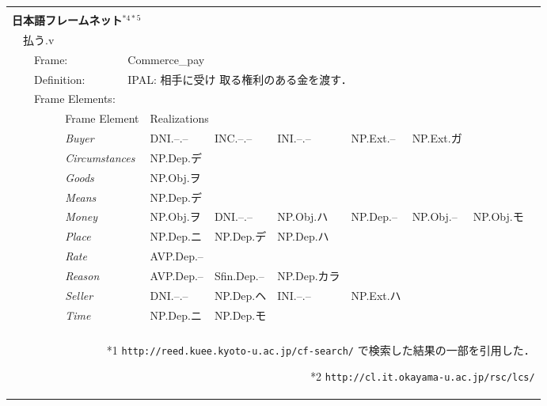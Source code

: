\documentclass[japanese]{jnlp_1.2b}
\begin{document}
\begin{figure}[p]
\begin{tabular}{llllllllllll}
   \vspace*{-2mm}& & & & & & & & & & & \\ 
\hline
   \vspace*{-2mm}& & & & & & & & & & & \\
   \multicolumn{12}{l}{\normalsize {\bf 日本語フレームネット}$^{*4
   *5}$}\\
   &\multicolumn{11}{l}{払う.v}\\
   &&\multicolumn{2}{l}{Frame:}&\multicolumn{8}{l}{Commerce\_pay}\\
   &&\multicolumn{2}{l}{Definition:}&\multicolumn{8}{l}{IPAL: 相手に受け
   取る権利のある金を渡す．}\\
   &&\multicolumn{10}{l}{Frame Elements:}\\\cline{4-11}
   &&&\multicolumn{2}{l}{Frame Element}&\multicolumn{6}{l}{Realizations}&\\\cline{4-11}
   &&&\multicolumn{2}{l}{\it Buyer}&DNI.--.--&INC.--.--&INI.--.--&NP.Ext.--&NP.Ext.ガ&&\\
   &&&\multicolumn{2}{l}{\it Circumstances}&NP.Dep.デ&&&&&&\\
   &&&\multicolumn{2}{l}{\it Goods}&NP.Obj.ヲ&&&&&&\\
   &&&\multicolumn{2}{l}{\it Means}&NP.Dep.デ&&&&&&\\
   &&&\multicolumn{2}{l}{\it Money}&NP.Obj.ヲ&DNI.--.--&NP.Obj.ハ&NP.Dep.--&NP.Obj.--&NP.Obj.モ&\\
   &&&\multicolumn{2}{l}{\it Place}&NP.Dep.ニ&NP.Dep.デ&NP.Dep.ハ&&&&\\
   &&&\multicolumn{2}{l}{\it Rate}&AVP.Dep.--&&&&&&\\
   &&&\multicolumn{2}{l}{\it Reason}&AVP.Dep.--&Sfin.Dep.--&NP.Dep.カラ&&&&\\
   &&&\multicolumn{2}{l}{\it Seller}&DNI.--.--&NP.Dep.ヘ&INI.--.--&NP.Ext.ハ&&&\\
   &&&\multicolumn{2}{l}{\it Time}&NP.Dep.ニ&NP.Dep.モ&&&&&\\
   \cline{4-11}
   &&&&&&&&&&&\\
\hline\hline
   \multicolumn{12}{r}{
   \begin{minipage}[t]{0.8\textwidth}
    \footnotesize 
    \begin{itemize}
     \item[\hspace*{3mm}*1] \texttt{http://reed.kuee.kyoto-u.ac.jp/cf-search/}
			    で検索した結果の一部を引用した．
     \item[\hspace*{3mm}*2] \texttt{http://cl.it.okayama-u.ac.jp/rsc/lcs/}

\end{itemize}
\end{minipage}}
\end{tabular}
\end{figure}
\end{document}
